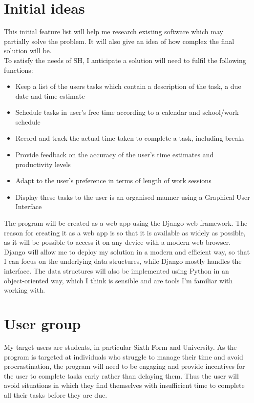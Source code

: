 \documentclass{article}
\begin{document}
\section{Initial ideas}
This initial feature list will help me research existing software which may
partially solve the problem. It will also give an idea of how complex the final
solution will be.\\

To satisfy the needs of SH, I anticipate a solution will need to fulfil the
following functions:

\begin{itemize}
\item Keep a list of the users tasks which contain a description of the task, a
  due date and time estimate
\item Schedule tasks in user's free time according to a calendar and school/work
  schedule
\item Record and track the actual time taken to complete a task, including
  breaks
\item Provide feedback on the accuracy of the user's time estimates and
  productivity levels
\item Adapt to the user's preference in terms of length of work sessions
\item Display these tasks to the user is an organised manner using a Graphical
  User Interface
\end{itemize}

The program will be created as a web app using the Django web framework. The
reason for creating it as a web app is so that it is available as widely as
possible, as it will be possible to access it on any device with a modern web
browser. Django will allow me to deploy my solution in a modern and efficient
way, so that I can focus on the underlying data structures, while Django mostly
handles the interface. The data structures will also be implemented using Python
in an object-oriented way, which I think is sensible and are tools I'm familiar
with working with.

\section{User group}
My target users are students, in particular Sixth Form and University. As the
program is targeted at individuals who struggle to manage their time and avoid
procrastination, the program will need to be engaging and provide incentives for
the user to complete tasks early rather than delaying them. Thus the user will
avoid situations in which they find themselves with insufficient time to
complete all their tasks before they are due.\\
\end{document}
